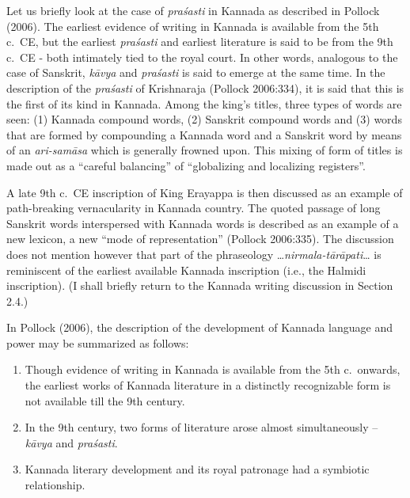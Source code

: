 Let us briefly look at the case of {\sl praśasti} in Kannada as described in Pollock (2006). The earliest evidence of writing in Kannada is available from the 5th c.\ CE, but the earliest {\sl praśasti} and earliest literature is said to be from the 9th c.\ CE - both intimately tied to the royal court. In other words, analogous to the case of Sanskrit, {\sl kāvya} and {\sl praśasti} is said to emerge at the same time. In the description of the {\sl praśasti} of Krishnaraja (Pollock 2006:334), it is said that this is the first of its kind in Kannada. Among the king’s titles, three types of words are seen: (1) Kannada compound words, (2) Sanskrit compound words and (3) words that are formed by compounding a Kannada word and a Sanskrit word by means of an {\sl ari-samāsa} which is generally frowned upon. This mixing of form of titles is made out as a “careful balancing” of “globalizing and localizing registers”.

A late 9th c.\ CE inscription of King Erayappa is then discussed as an example of path-breaking vernacularity in Kannada country. The quoted passage of long Sanskrit words interspersed with Kannada words is described as an example of a new lexicon, a new “mode of representation” (Pollock 2006:335). The discussion does not mention however that part of the phraseology …{\sl nirmala-tārāpati}… is reminiscent of the earliest available Kannada inscription (i.e., the Halmidi inscription). (I shall briefly return to the Kannada writing discussion in Section 2.4.) 

In Pollock (2006), the description of the development of Kannada language and power may be summarized as follows: 
\begin{enumerate}
\itemsep=0pt
\item Though evidence of writing in Kannada is available from the 5th c.\ onwards, the earliest works of Kannada literature in a distinctly recognizable form is not available till the 9th century.
\item In the 9th century, two forms of literature arose almost simultaneously – {\sl kāvya} and {\sl praśasti}.
\item Kannada literary development and its royal patronage had a symbiotic relationship. 
\end{enumerate}

